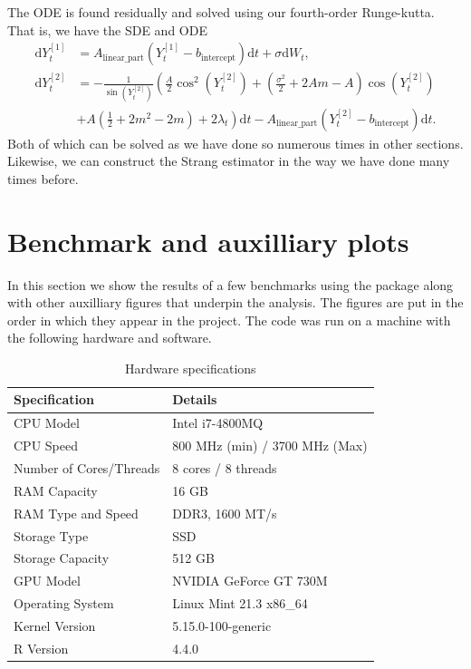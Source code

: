 The ODE is found residually and solved using our fourth-order Runge-kutta. That is, we have the SDE and ODE
\begin{align}
    \mathrm{d}Y_t^{[1]} &= A_{\mathrm{linear\_part}}\left(Y_t^{[1]} -  b_{\mathrm{intercept}}\right)\mathrm{d}t + \sigma \mathrm{d}W_t,\\
    \mathrm{d}Y_t^{[2]} &=- \frac{1}{\sin(Y_t^{[2]})}\left(\frac{A}{2}\cos^2(Y_t^{[2]}) + \left(\frac{\sigma^2}{2} + 2 Am - A\right)\cos(Y_t^{[2]}) \right. \nonumber \\
    &+ \left. A \left(\frac{1}{2} + 2m^2 - 2m\right) + 2\lambda_t\right) \mathrm{d}t - A_{\mathrm{linear\_part}}\left(Y_t^{[2]} -  b_{\mathrm{intercept}}\right)\mathrm{d}t  \label{eq:dynamicjacobiODE}.
\end{align}
Both of which can be solved as we have done so numerous times in other sections. Likewise, we can construct the Strang estimator in the way we have done many times before.
\newpage
\section{Benchmark and auxilliary plots}\label{section:benchmark}
In this section we show the results of a few benchmarks using the  package \cite{microbenchmark} along with other auxilliary figures that underpin the analysis. The figures are put in the order in which they appear in the project. The code was run on a machine with the following hardware and software.
\begin{table}[ht]
    \centering
    \begin{tabular}{@{}ll@{}}
    \toprule
    Specification      & Details                              \\ \midrule
    CPU Model          & Intel i7-4800MQ                 \\
    CPU Speed          & 800 MHz (min) / 3700 MHz (Max)     \\
    Number of Cores/Threads & 8 cores / 8 threads              \\
    RAM Capacity       & 16 GB                                \\
    RAM Type and Speed & DDR3, 1600 MT/s                      \\
    Storage Type       & SSD                                  \\
    Storage Capacity   & 512 GB                               \\
    GPU Model          & NVIDIA GeForce GT 730M              \\
    Operating System   & Linux Mint 21.3 x86\_64                   \\
    Kernel Version     & 5.15.0-100-generic                    \\
    R Version          & 4.4.0                                \\
    \bottomrule
    \end{tabular}
    \caption{Hardware specifications}
    \label{tab:specs}
    \end{table}

